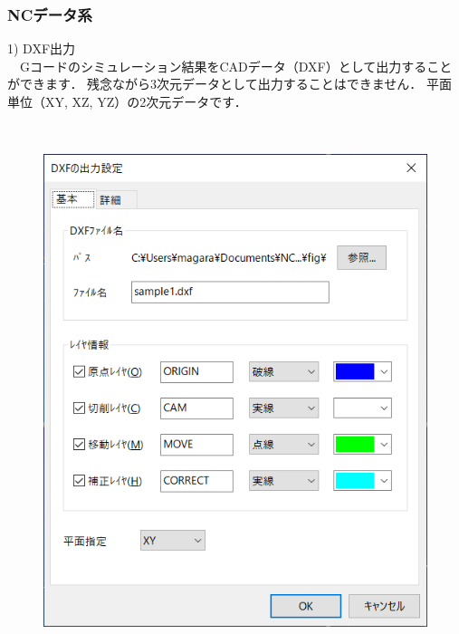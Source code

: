\subsubsection{NCデータ系}

\begin{minipage}[t]{0.48\textwidth}
1) DXF出力\label{sec:output-dxf}\\
　Gコードのシミュレーション結果をCADデータ（DXF）として出力することができます．
残念ながら3次元データとして出力することはできません．
平面単位（XY, XZ, YZ）の2次元データです．
\end{minipage}
\begin{minipage}[t]{0.02\textwidth}
　
\end{minipage}
\begin{minipage}[t]{0.5\textwidth}
\vspace*{-2zh}
\begin{figure}[H]
\centering
\includegraphics[width=\textwidth]{No6/fig/nc-outdxf.png}
\label{fig:nc-outdxf.png}
\end{figure}
\end{minipage}

